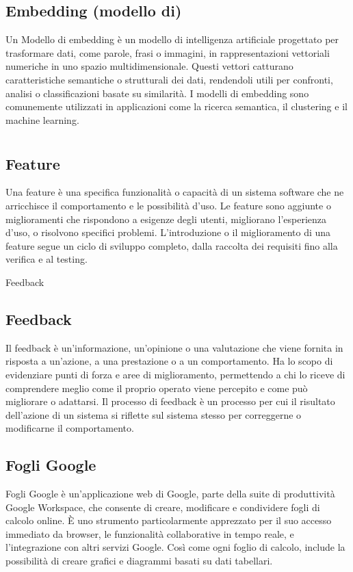 \hypertarget{sec:embedding}{}
\subsection*{Embedding (modello di)}
Un Modello di embedding è un modello di intelligenza artificiale progettato per trasformare dati, come parole, frasi o immagini, in rappresentazioni 
vettoriali numeriche in uno spazio multidimensionale. Questi vettori catturano caratteristiche semantiche o strutturali dei dati, rendendoli utili per 
confronti, analisi o classificazioni basate su similarità. I modelli di embedding sono comunemente utilizzati in applicazioni come la ricerca semantica, 
il clustering e il machine learning.

\newpage



\section{}

\hypertarget{sec:feature}{}
\subsection*{Feature}
Una feature è una specifica funzionalità o capacità di un sistema software che ne arricchisce il comportamento e le possibilità d'uso. Le feature sono 
aggiunte o miglioramenti che rispondono a esigenze degli utenti, migliorano l’esperienza d’uso, o risolvono specifici problemi. L'introduzione o il 
miglioramento di una feature segue un ciclo di sviluppo completo, dalla raccolta dei requisiti fino alla verifica e al testing.

\hypertarget{sec:feedback}{Feedback}
\subsection*{Feedback}
Il feedback è un'informazione, un'opinione o una valutazione che viene fornita in risposta a un'azione, a una prestazione o a un 
comportamento. Ha lo scopo di evidenziare punti di forza e aree di miglioramento, permettendo a chi lo riceve di comprendere meglio come il 
proprio operato viene percepito e come può migliorare o adattarsi. Il processo di feedback è un processo per cui il risultato dell’azione 
di un sistema si riflette sul sistema stesso per correggerne o modificarne il comportamento.

\subsection*{Fogli Google}
Fogli Google è un'applicazione web di Google, parte della suite di produttività Google Workspace, che consente di creare, modificare e condividere fogli 
di calcolo online. È uno strumento particolarmente apprezzato per il suo accesso immediato da browser, le funzionalità collaborative in tempo reale, e 
l'integrazione con altri servizi Google. Così come ogni foglio di calcolo, include la possibilità di creare grafici e diagrammi basati su dati tabellari.

